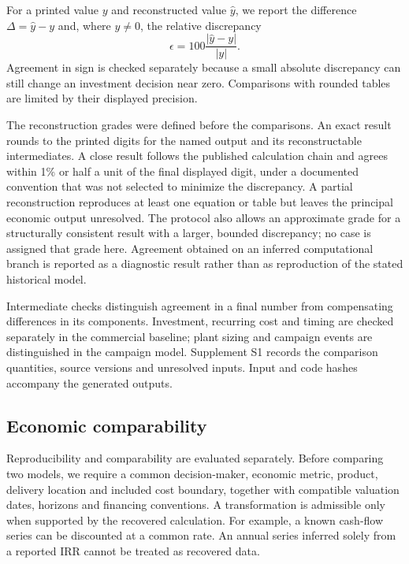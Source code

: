 \documentclass[final,5p,times,twocolumn]{elsarticle}
\begin{document}
For a printed value $y$ and reconstructed value $\widehat y$, we report the difference $\Delta=\widehat y-y$ and, where $y\ne0$, the relative discrepancy
\begin{equation}
\epsilon=100\frac{|\widehat y-y|}{|y|}.
\label{eq:error}
\end{equation}
Agreement in sign is checked separately because a small absolute discrepancy can still change an investment decision near zero. Comparisons with rounded tables are limited by their displayed precision.

The reconstruction grades were defined before the comparisons. An exact result rounds to the printed digits for the named output and its reconstructable intermediates. A close result follows the published calculation chain and agrees within 1\% or half a unit of the final displayed digit, under a documented convention that was not selected to minimize the discrepancy. A partial reconstruction reproduces at least one equation or table but leaves the principal economic output unresolved. The protocol also allows an approximate grade for a structurally consistent result with a larger, bounded discrepancy; no case is assigned that grade here. Agreement obtained on an inferred computational branch is reported as a diagnostic result rather than as reproduction of the stated historical model.

Intermediate checks distinguish agreement in a final number from compensating differences in its components. Investment, recurring cost and timing are checked separately in the commercial baseline; plant sizing and campaign events are distinguished in the campaign model. Supplement S1 records the comparison quantities, source versions and unresolved inputs. Input and code hashes accompany the generated outputs.

\subsection{Economic comparability}
Reproducibility and comparability are evaluated separately. Before comparing two models, we require a common decision-maker, economic metric, product, delivery location and included cost boundary, together with compatible valuation dates, horizons and financing conventions. A transformation is admissible only when supported by the recovered calculation. For example, a known cash-flow series can be discounted at a common rate. An annual series inferred solely from a reported IRR cannot be treated as recovered data.
\end{document}
